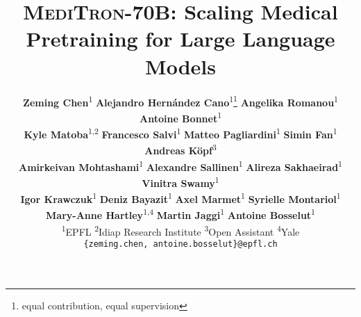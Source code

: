 \documentclass{article}
\newcommand{\mtronb}{\textsc{MediTron-70B}\xspace}
\begin{document}
\title{\mtronb: Scaling Medical Pretraining for Large Language Models} 

\author{
\textbf{Zeming Chen}\textsuperscript{\rm 1} \quad 
\textbf{Alejandro Hernández Cano}\textsuperscript{\rm 1}\thanks{equal contribution, equal supervision} \quad 
\textbf{Angelika Romanou}\textsuperscript{\rm 1} \quad 
\textbf{Antoine Bonnet}\textsuperscript{\rm 1} \\\vspace{-3mm} 
\textbf{Kyle Matoba}\textsuperscript{\rm 1,2 } \quad
\textbf{Francesco Salvi}\textsuperscript{\rm 1} \quad 
\textbf{Matteo Pagliardini}\textsuperscript{\rm 1} \quad
\textbf{Simin Fan}\textsuperscript{\rm 1} \quad
\textbf{Andreas Köpf}\textsuperscript{\rm 3} \\
\textbf{Amirkeivan Mohtashami}\textsuperscript{\rm 1} \quad 
\textbf{Alexandre Sallinen}\textsuperscript{\rm 1} \quad
\textbf{Alireza Sakhaeirad}\textsuperscript{\rm 1} \quad
\textbf{Vinitra Swamy}\textsuperscript{\rm 1} \\
\textbf{Igor Krawczuk}\textsuperscript{\rm 1} \quad
\textbf{Deniz Bayazit}\textsuperscript{\rm 1} \quad 
\textbf{Axel Marmet}\textsuperscript{\rm 1} \quad
\textbf{Syrielle Montariol}\textsuperscript{\rm 1} \\

\textbf{Mary-Anne Hartley}\textsuperscript{\rm 1,4} \quad 
\textbf{Martin Jaggi}\textsuperscript{\rm 1} \quad 
\textbf{Antoine Bosselut}\textsuperscript{\rm 1} \\\vspace{1mm}
\textsuperscript{\rm 1}EPFL \quad
\textsuperscript{\rm 2}Idiap Research Institute \quad
\textsuperscript{\rm 3}Open Assistant \quad
\textsuperscript{\rm 4}Yale \\
  \texttt{\{zeming.chen, antoine.bosselut\}@epfl.ch}
}

\maketitle

\vspace{-5mm}
\end{document}
